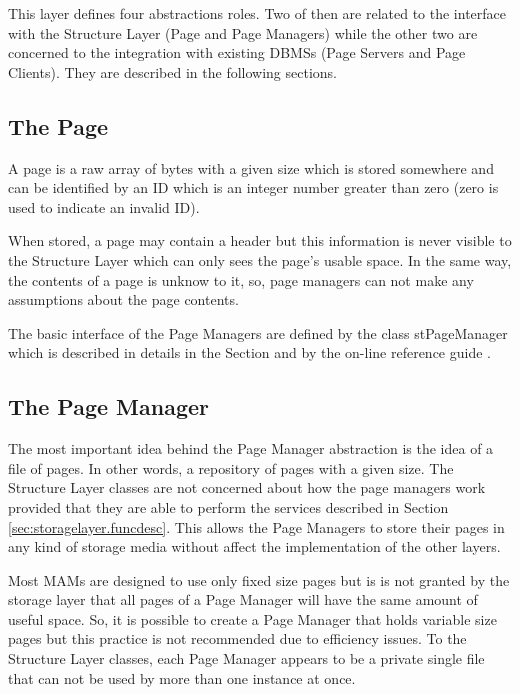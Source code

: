 This layer defines four abstractions roles. Two of then are related to the interface with the Structure Layer (Page and Page Managers) while the other two are concerned to the integration with existing DBMSs (Page Servers and Page Clients). They are described in the following sections.

\subsection{The Page}
\label{sec:storagelayer.page}

A page is a raw array of bytes with a given size which is stored somewhere and can be identified by an ID which is an integer number greater than zero (zero is used to indicate an invalid ID).

When stored, a page may contain a header but this information is never visible to the Structure Layer which can only sees the page's usable space. In the same way, the contents of a page is unknow to it, so, page managers can not make any assumptions about the page contents.

The basic interface of the Page Managers are defined by the class stPageManager which is described in details in the Section \label{sec:storagelayer.stPageManager} and by the on-line reference guide \cite{onlineman}.

\subsection{The Page Manager}
\label{sec:storagelayer.pageman}

The most important idea behind the Page Manager abstraction is the idea of a file of pages. In other words, a repository of pages with a given size. The Structure Layer classes are not concerned about how the page managers work provided that they are able to perform the services described in Section \ref{sec:storagelayer.funcdesc}. This allows the Page Managers to store their pages in any kind of storage media without affect the implementation of the other layers.

Most MAMs are designed to use only fixed size pages but is is not granted by the storage layer that all pages of a Page Manager will have the same amount of useful space. So, it is possible to create a Page Manager that holds variable size pages but this practice is not recommended due to efficiency issues. To the Structure Layer classes, each Page Manager appears to be a private single file that can not be used by more than one instance at once.


